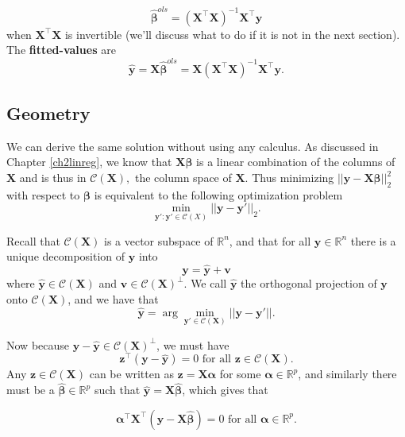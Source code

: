 \documentclass[
]{book}
\theoremstyle{definition}
\theoremstyle{definition}
\theoremstyle{definition}
\theoremstyle{definition}
\theoremstyle{remark}
\begin{document}
\begin{equation}
\hat{\boldsymbol \beta}^{ols}=\left (\mathbf X^\top \mathbf X\right )^{-1}\mathbf X^\top \mathbf y
\label{eq:uni1}
\end{equation}
when \(\mathbf X^\top \mathbf X\) is invertible (we'll discuss what to do if it is not in the next section).
The \textbf{fitted-values} are \[\hat{\mathbf y}= \mathbf X\hat{\boldsymbol \beta}^{ols}=\mathbf X(\mathbf X^\top \mathbf X)^{-1}\mathbf X^\top \mathbf y.\]

\subsection{Geometry}\label{geometry}

We can derive the same solution without using any calculus.
As discussed in Chapter \ref{ch2linreg}, we know that \(\mathbf X\boldsymbol \beta\) is a linear combination of the columns of \(\mathbf X\) and is thus in \(\mathcal{C}(\mathbf X),\) the column space of \(\mathbf X\). Thus minimizing \(||\mathbf y- \mathbf X\boldsymbol \beta||_2^2\) with respect to \(\boldsymbol \beta\) is equivalent to the following optimization problem \[\min_{\mathbf y': \mathbf y' \in \mathcal{C}(X)} ||\mathbf y-\mathbf y'||_2.\]

Recall that \(\mathcal{C}(\mathbf X)\) is a vector subspace of \(\mathbb{R}^n\), and that for all \(\mathbf y\in \mathbb{R}^n\) there is a unique decomposition of \(\mathbf y\) into
\[\mathbf y= \hat{\mathbf y} + \mathbf v\]
where \(\hat{\mathbf y}\in \mathcal{C}(\mathbf X)\) and \(\mathbf v\in \mathcal{C}(\mathbf X)^\perp\). We call \(\hat{\mathbf y}\) the orthogonal projection of \(\mathbf y\) onto \(\mathcal{C}(\mathbf X)\), and we have that
\[\hat{\mathbf y}=\arg \min_{\mathbf y' \in \mathcal{C}(\mathbf X)}||\mathbf y- \mathbf y'||.\]

Now because \(\mathbf y-\hat{\mathbf y}\in \mathcal{C}(\mathbf X)^\perp\), we must have
\[\mathbf z^\top(\mathbf y-\hat{\mathbf y})=0 \mbox{ for all } \mathbf z\in \mathcal{C}(\mathbf X).\]
Any \(\mathbf z\in \mathcal{C}(\mathbf X)\) can be written as \(\mathbf z= \mathbf X\boldsymbol \alpha\) for some \(\boldsymbol \alpha\in \mathbb{R}^p\), and similarly there must be a \(\hat{\boldsymbol \beta}\in \mathbb{R}^p\) such that \(\hat{\mathbf y}=\mathbf X\hat{\boldsymbol \beta}\), which gives that

\[{\boldsymbol \alpha}^\top\mathbf X^\top (\mathbf y-\mathbf X\hat{\boldsymbol \beta})=0 \mbox{ for all } \boldsymbol \alpha\in \mathbb{R}^p.\]
\end{document}
